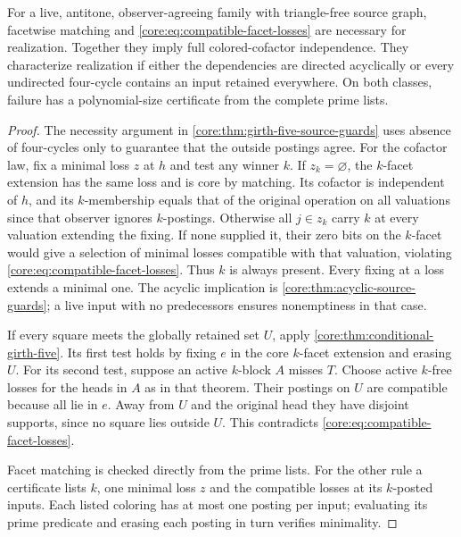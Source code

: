 \begin{theorem}
\label{core:thm:triangle-free-shared-inputs}
For a live, antitone, observer-agreeing family with triangle-free
source graph, facetwise matching and
\eqref{core:eq:compatible-facet-losses} are necessary for realization.
Together they imply full colored-cofactor independence. They characterize
realization if either the dependencies are directed acyclically or every
undirected four-cycle contains an input retained everywhere.
On both classes, failure has a polynomial-size certificate from the
complete prime lists.
\end{theorem}
\begin{proof}
The necessity argument in \cref{core:thm:girth-five-source-guards}
uses absence of four-cycles only to guarantee that the outside
postings agree. For the cofactor law, fix a minimal loss $z$ at $h$
and test any winner $k$. If $z_k=\varnothing$, the $k$-facet extension
has the same loss and is core by matching. Its cofactor is independent
of $h$, and its $k$-membership equals that of the original operation
on all valuations since that observer ignores $k$-postings. Otherwise
all $j\in z_k$ carry $k$ at every valuation extending the fixing.
If none supplied it, their zero bits on the $k$-facet would give a
selection of minimal losses compatible with that valuation, violating
\eqref{core:eq:compatible-facet-losses}. Thus $k$ is always present.
Every fixing at a loss extends a minimal one. The acyclic implication
is \cref{core:thm:acyclic-source-guards}; a live input with no
predecessors ensures nonemptiness in that case.

If every square meets the globally retained set $U$, apply
\cref{core:thm:conditional-girth-five}. Its first test holds by
fixing $e$ in the core $k$-facet extension and erasing $U$.
For its second test, suppose an active $k$-block $A$ misses $T$.
Choose active $k$-free losses for the heads in $A$ as in that theorem.
Their postings on $U$ are compatible because all lie in $e$.
Away from $U$ and the original head they have disjoint supports,
since no square lies outside $U$. This contradicts
\eqref{core:eq:compatible-facet-losses}.

Facet matching is checked directly from the prime lists. For the
other rule a certificate lists $k$, one minimal loss $z$ and the
compatible losses at its $k$-posted inputs. Each listed coloring
has at most one posting per input; evaluating its prime predicate
and erasing each posting in turn verifies minimality.
\end{proof}

